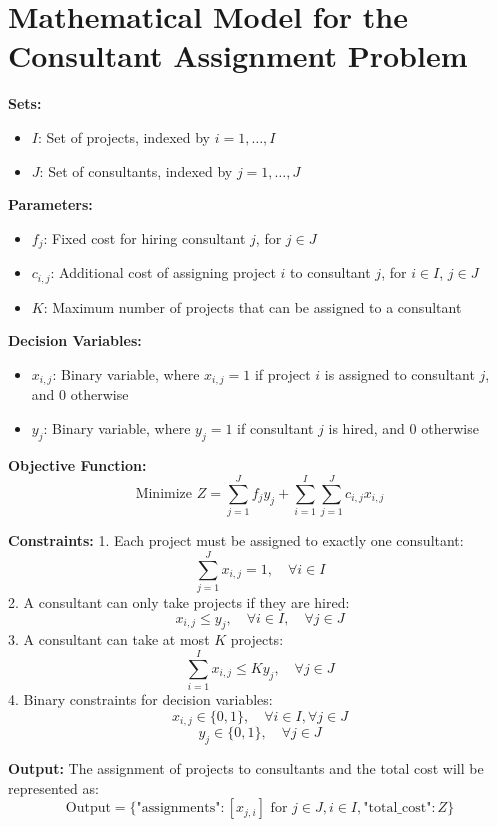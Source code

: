 \documentclass{article}
\begin{document}
\section*{Mathematical Model for the Consultant Assignment Problem}

\textbf{Sets:}
\begin{itemize}
    \item $I$: Set of projects, indexed by $i = 1, \ldots, I$
    \item $J$: Set of consultants, indexed by $j = 1, \ldots, J$
\end{itemize}

\textbf{Parameters:}
\begin{itemize}
    \item $f_j$: Fixed cost for hiring consultant $j$, for $j \in J$
    \item $c_{i,j}$: Additional cost of assigning project $i$ to consultant $j$, for $i \in I$, $j \in J$
    \item $K$: Maximum number of projects that can be assigned to a consultant
\end{itemize}

\textbf{Decision Variables:}
\begin{itemize}
    \item $x_{i,j}$: Binary variable, where $x_{i,j} = 1$ if project $i$ is assigned to consultant $j$, and $0$ otherwise
    \item $y_j$: Binary variable, where $y_j = 1$ if consultant $j$ is hired, and $0$ otherwise
\end{itemize}

\textbf{Objective Function:}
\[
\text{Minimize } Z = \sum_{j=1}^J f_j y_j + \sum_{i=1}^I \sum_{j=1}^J c_{i,j} x_{i,j}
\]

\textbf{Constraints:}
1. Each project must be assigned to exactly one consultant:
\[
\sum_{j=1}^J x_{i,j} = 1, \quad \forall i \in I
\]
2. A consultant can only take projects if they are hired:
\[
x_{i,j} \leq y_j, \quad \forall i \in I, \quad \forall j \in J
\]
3. A consultant can take at most $K$ projects:
\[
\sum_{i=1}^I x_{i,j} \leq K y_j, \quad \forall j \in J
\]
4. Binary constraints for decision variables:
\[
x_{i,j} \in \{0, 1\}, \quad \forall i \in I, \forall j \in J
\]
\[
y_j \in \{0, 1\}, \quad \forall j \in J
\]

\textbf{Output:}
The assignment of projects to consultants and the total cost will be represented as:
\[
\text{Output} = \{ \text{"assignments"}: [x_{j,i}] \text{ for } j \in J, i \in I, \text{"total\_cost"}: Z \}
\]
\end{document}
